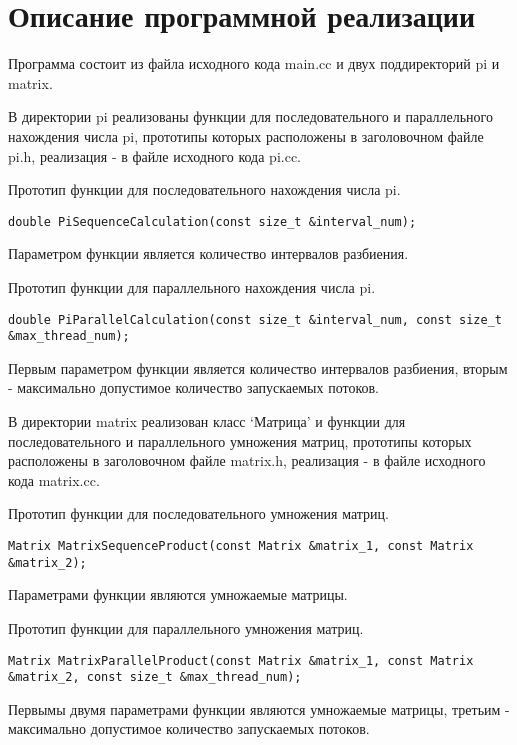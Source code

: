 \documentclass{report}
\begin{document}
\section*{Описание программной реализации}
\par Программа состоит из файла исходного кода main.cc и двух поддиректорий pi и matrix.
\par В директории pi реализованы функции для последовательного и параллельного нахождения числа pi, прототипы которых расположены в заголовочном файле pi.h, реализация - в файле исходного кода pi.cc.
\par Прототип функции для последовательного нахождения числа pi.
\begin{lstlisting}
double PiSequenceCalculation(const size_t &interval_num);
\end{lstlisting}
Параметром функции является количество интервалов разбиения.
\par Прототип функции для параллельного нахождения числа pi.
\begin{lstlisting}
double PiParallelCalculation(const size_t &interval_num, const size_t &max_thread_num);
\end{lstlisting}
Первым параметром функции является количество интервалов разбиения, вторым - максимально допустимое количество запускаемых потоков.
\par В директории matrix реализован класс `Матрица' и функции для последовательного и параллельного умножения матриц, прототипы которых расположены в заголовочном файле matrix.h, реализация - в файле исходного кода matrix.cc.
\par Прототип функции для последовательного умножения матриц.
\begin{lstlisting}
Matrix MatrixSequenceProduct(const Matrix &matrix_1, const Matrix &matrix_2);
\end{lstlisting}
Параметрами функции являются умножаемые матрицы.
\par Прототип функции для параллельного умножения матриц.
\begin{lstlisting}
Matrix MatrixParallelProduct(const Matrix &matrix_1, const Matrix &matrix_2, const size_t &max_thread_num);
\end{lstlisting}
Первымы двумя параметрами функции являются умножаемые матрицы, третьим - максимально допустимое количество запускаемых потоков.
\clearpage
\end{document}
